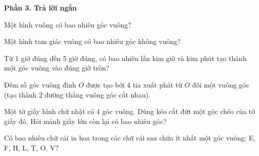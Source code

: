 \textbf{Phần 3. Trả lời ngắn}

\begin{ex} %
Một hình vuông có bao nhiêu góc vuông?
\end{ex}

\begin{ex} %
Một hình tam giác vuông có bao nhiêu góc không vuông?
\end{ex}

\begin{ex} %
Từ 1 giờ đúng đến 5 giờ đúng, có bao nhiêu lần kim giờ và kim phút tạo thành một góc vuông vào đúng giờ tròn?
\end{ex}

\begin{ex} %
Đếm số góc vuông đỉnh $O$ được tạo bởi 4 tia xuất phát từ $O$ đôi một vuông góc (tạo thành 2 đường thẳng vuông góc cắt nhau).
\end{ex}

\begin{ex} %
Một tờ giấy hình chữ nhật có 4 góc vuông. Dùng kéo cắt đứt một góc chéo của tờ giấy đó. Hỏi mảnh giấy lớn còn lại có bao nhiêu góc?
\end{ex}

\begin{ex} %
Có bao nhiêu chữ cái in hoa trong các chữ cái sau chứa ít nhất một góc vuông: E, F, H, L, T, O, V?
\end{ex}

